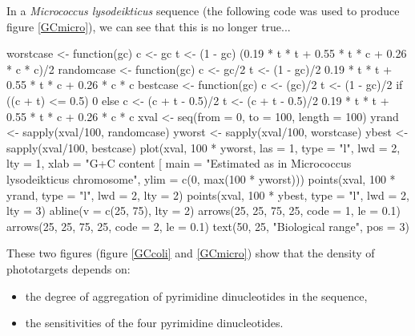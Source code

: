 \documentclass{article}
\begin{document}
In a \textit{Micrococcus lysodeikticus} sequence (the following code
was used to produce figure \ref{GCmicro}), we can see that this 
is no longer true...

\begin{Schunk}
\begin{Sinput}
 worstcase <- function(gc) {
     c <- gc
     t <- (1 - gc)
     (0.19 * t * t + 0.55 * t * c + 0.26 * c * c)/2
 }
 randomcase <- function(gc) {
     c <- gc/2
     t <- (1 - gc)/2
     0.19 * t * t + 0.55 * t * c + 0.26 * c * c
 }
 bestcase <- function(gc) {
     c <- (gc)/2
     t <- (1 - gc)/2
     if ((c + t) <= 0.5) {
         0
     }
     else {
         c <- (c + t - 0.5)/2
         t <- (c + t - 0.5)/2
         0.19 * t * t + 0.55 * t * c + 0.26 * c * c
     }
 }
 xval <- seq(from = 0, to = 100, length = 100)
 yrand <- sapply(xval/100, randomcase)
 yworst <- sapply(xval/100, worstcase)
 ybest <- sapply(xval/100, bestcase)
 plot(xval, 100 * yworst, las = 1, type = "l", lwd = 2, lty = 1, 
     xlab = "G+C content [%
     main = "Estimated as in Micrococcus lysodeikticus chromosome", 
     ylim = c(0, max(100 * yworst)))
 points(xval, 100 * yrand, type = "l", lwd = 2, lty = 2)
 points(xval, 100 * ybest, type = "l", lwd = 2, lty = 3)
 abline(v = c(25, 75), lty = 2)
 arrows(25, 25, 75, 25, code = 1, le = 0.1)
 arrows(25, 25, 75, 25, code = 2, le = 0.1)
 text(50, 25, "Biological range", pos = 3)
\end{Sinput}
\end{Schunk}

\begin{figure}
\centering{}
\end{figure}

These two figures (figure \ref{GCcoli} and \ref{GCmicro}) show 
that the density of phototargets depends on:

\begin{itemize}
\item the degree of aggregation of pyrimidine dinucleotides in the
sequence,
\item the sensitivities of the four pyrimidine dinucleotides.
  \end{itemize}
\end{document}
